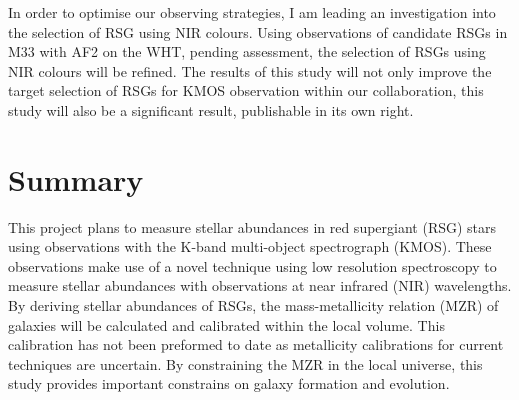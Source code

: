 \documentclass[a4paper,12pt]{article}
\begin{document}
In order to optimise our observing strategies, I am leading an investigation into the selection of RSG using NIR colours. 
Using observations of candidate RSGs in M33 with AF2 on the WHT, pending assessment, the selection of RSGs using NIR colours will be refined. 
The results of this study will not only improve the target selection of RSGs for KMOS observation within our collaboration, this study will also be a significant result, publishable in its own right. 



%
%

 
\section{Summary}

This project plans to measure stellar abundances in red supergiant (RSG) stars using observations with the K-band multi-object spectrograph (KMOS). 
These observations make use of a novel technique using low resolution spectroscopy to measure stellar abundances with observations at near infrared (NIR) wavelengths. 
By deriving stellar abundances of RSGs, the mass-metallicity relation (MZR) of galaxies will be calculated and calibrated within the local volume.
This calibration has not been preformed to date as metallicity calibrations for current techniques are uncertain.
By constraining the MZR in the local universe, this study provides important constrains on galaxy formation and evolution. 
\end{document}
